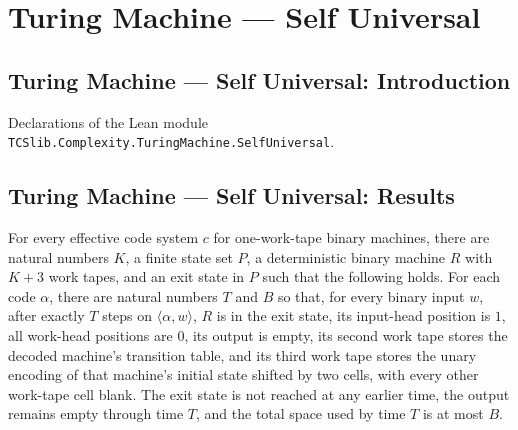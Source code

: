 \section{Turing Machine --- Self Universal}
\subsection*{Turing Machine --- Self Universal: Introduction}

Declarations of the Lean module \texttt{TCSlib.Complexity.TuringMachine.SelfUniversal}.

\subsection*{Turing Machine --- Self Universal: Results}

\begin{theorem}
\label{Turing.exists_selfStartupTM}
\leanok
{}
For every effective code system $c$ for one-work-tape binary machines, there are natural
numbers $K$, a finite state set $P$, a deterministic binary machine $R$ with $K+3$ work
tapes, and an exit state in $P$ such that the following holds. For each code $\alpha$,
there are natural numbers $T$ and $B$ so that, for every binary input $w$, after exactly
$T$ steps on $\langle\alpha,w\rangle$, $R$ is in the exit state, its input-head position
is $1$, all work-head positions are $0$, its output is empty, its second work tape
stores the decoded machine's transition table, and its third work tape stores the unary
encoding of that machine's initial state shifted by two cells, with every other
work-tape cell blank. The exit state is not reached at any earlier time, the output
remains empty through time $T$, and the total space used by time $T$ is at most $B$.
\end{theorem}

